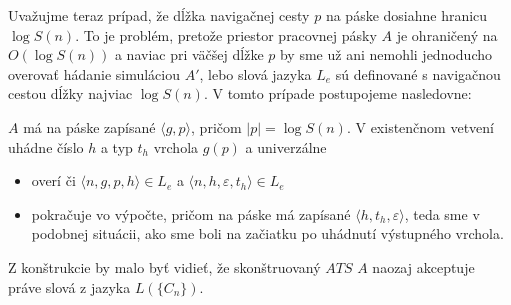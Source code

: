 {\begin{dokaz}
Uvažujme teraz prípad, že dĺžka navigačnej cesty $p$ na páske
dosiahne hranicu $\log S(n)$. To je problém, pretože priestor
pracovnej pásky $A$ je ohraničený na $O(\log S(n))$ a naviac pri
väčšej dĺžke $p$ by sme už ani nemohli jednoducho overovať hádanie
simuláciou $A'$, lebo slová jazyka $L_e$ sú definované s
navigačnou cestou dĺžky najviac $\log S(n)$. V tomto prípade
postupojeme nasledovne:

$A$ má na páske zapísané $\langle g,p\rangle $, pričom $|p|=\log
S(n)$. V existenčnom vetvení uhádne číslo $h$ a typ $t_h$ vrchola
$g(p)$ a univerzálne
\begin{itemize}
  \item overí či $\langle n,g,p,h\rangle \in L_e$ a $\langle n,h,\varepsilon,t_h\rangle \in
  L_e$
  \item pokračuje vo výpočte, pričom na páske má zapísané
  $\langle h,t_h,\varepsilon\rangle $, teda sme v podobnej situácii, ako sme
  boli na začiatku po uhádnutí výstupného vrchola.
\end{itemize}

Z konštrukcie by malo byť vidieť, že skonštruovaný $ATS$ $A$
naozaj akceptuje práve slová z jazyka $L(\{ C_n\})$.


\end{dokaz}}
